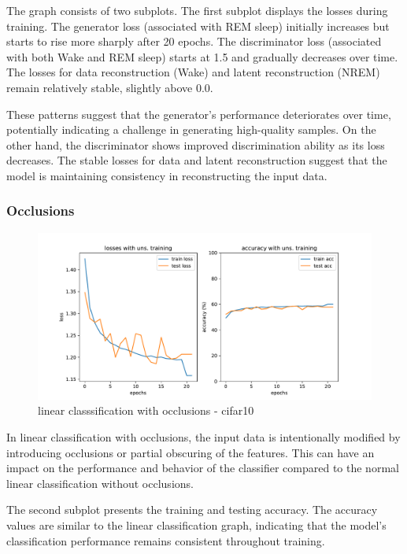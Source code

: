 \documentclass{midl} %
\begin{document}
The graph consists of two subplots. The first subplot displays the losses during training. The generator loss (associated with REM sleep) initially increases but starts to rise more sharply after 20 epochs. The discriminator loss (associated with both Wake and REM sleep) starts at 1.5 and gradually decreases over time. The losses for data reconstruction (Wake) and latent reconstruction (NREM) remain relatively stable, slightly above 0.0.

These patterns suggest that the generator's performance deteriorates over time, potentially indicating a challenge in generating high-quality samples. On the other hand, the discriminator shows improved discrimination ability as its loss decreases. The stable losses for data and latent reconstruction suggest that the model is maintaining consistency in reconstructing the input data.


\subsubsection{Occlusions}
\begin{figure}[H]
  \centering
  \includegraphics[width=1.2\textwidth]{linear_classif_occ_cifar10.pdf}
  \caption{linear classsification with occlusions - cifar10}
  \label{fig:linear classsification with occlusions - cifar10 }
\end{figure}

In linear classification with occlusions, the input data is intentionally modified by introducing occlusions or partial obscuring of the features. This can have an impact on the performance and behavior of the classifier compared to the normal linear classification without occlusions. 

The second subplot presents the training and testing accuracy. The accuracy values are similar to the linear classification graph, indicating that the model's classification performance remains consistent throughout training.
\end{document}
